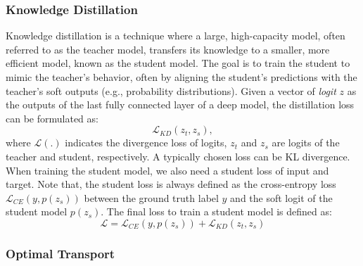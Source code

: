\subsubsection{Knowledge Distillation}
Knowledge distillation \cite{hinton2015distilling} is a technique where a large, high-capacity model, often referred to as the teacher model, transfers its knowledge to a smaller, more efficient model, known as the student model. The goal is to train the student to mimic the teacher’s behavior, often by aligning the student’s predictions with the teacher's soft outputs (e.g., probability distributions). Given a vector of \textit{logit} $z$ as the outputs of the last fully connected layer of a deep model, the distillation loss can be formulated as:
\begin{equation}
    \mathcal{L}_{KD} (z_{t}, z_{s}),
\end{equation}
where $\mathcal{L}(.)$ indicates the divergence loss of logits, $z_{t}$ and $z_{s}$ are logits of the teacher and student, respectively. A typically chosen loss can be KL divergence. When training the student model, we also need a student loss of input and target. Note that, the student loss is always defined as the cross-entropy loss $\mathcal{L}_{CE}(y,p(z_{s}))$ between the ground truth label $y$ and the soft logit of the student model $p(z_{s})$. The final loss to train a student model is defined as:
\begin{equation}
    \mathcal{L} = \mathcal{L}_{CE}(y,p(z_{s})) + \mathcal{L}_{KD} (z_{t}, z_{s})
\end{equation}




\subsubsection{Optimal Transport}

